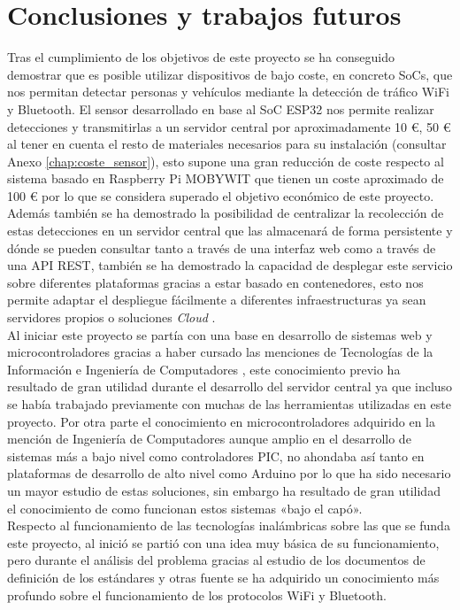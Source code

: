 \documentclass[../proyecto.tex]{subfiles}
\begin{document}
\chapter{Conclusiones y trabajos futuros}\label{chap:conclusiones}

Tras el cumplimiento de los objetivos de este proyecto se ha conseguido demostrar que es posible utilizar dispositivos de bajo coste, en concreto SoCs, que nos permitan detectar personas y vehículos mediante la detección de tráfico WiFi y Bluetooth. El sensor desarrollado en base al SoC ESP32 nos permite realizar detecciones y transmitirlas a un servidor central por aproximadamente 10 €, 50 € al tener en cuenta el resto de materiales necesarios para su instalación (consultar Anexo \autoref{chap:coste_sensor}), esto supone una gran reducción de coste respecto al sistema basado en Raspberry Pi MOBYWIT que tienen un coste aproximado de 100 € por lo que se considera superado el objetivo económico de este proyecto. Además también se ha demostrado la posibilidad de centralizar la recolección de estas detecciones en un servidor central que las almacenará de forma persistente y dónde se pueden consultar tanto a través de una interfaz web como a través de una API REST, también se ha demostrado la capacidad de desplegar este servicio sobre diferentes plataformas gracias a estar basado en contenedores, esto nos permite adaptar el despliegue fácilmente a diferentes infraestructuras ya sean servidores propios o soluciones \textit{Cloud} .\\

Al iniciar este proyecto se partía con una base en desarrollo de sistemas web y microcontroladores gracias a haber cursado las menciones de Tecnologías de la Información e Ingeniería de Computadores , este conocimiento previo ha resultado de gran utilidad durante el desarrollo del servidor central ya que incluso se había trabajado previamente con muchas de las herramientas utilizadas en este proyecto. Por otra parte el conocimiento en microcontroladores adquirido en la mención de Ingeniería de Computadores aunque amplio en el desarrollo de sistemas más a bajo nivel como controladores PIC,  no ahondaba así tanto en plataformas de desarrollo de alto nivel como Arduino por lo que ha sido necesario un mayor estudio de estas soluciones, sin embargo ha resultado de gran utilidad el conocimiento de como funcionan estos sistemas «bajo el capó». \\

Respecto al funcionamiento de las tecnologías inalámbricas sobre las que se funda este proyecto, al inició se partió con una idea muy básica de su funcionamiento, pero durante el análisis del problema gracias al estudio de los documentos de definición de los estándares y otras fuente se ha adquirido un conocimiento más profundo sobre el funcionamiento de los protocolos WiFi y Bluetooth.\\
\end{document}
